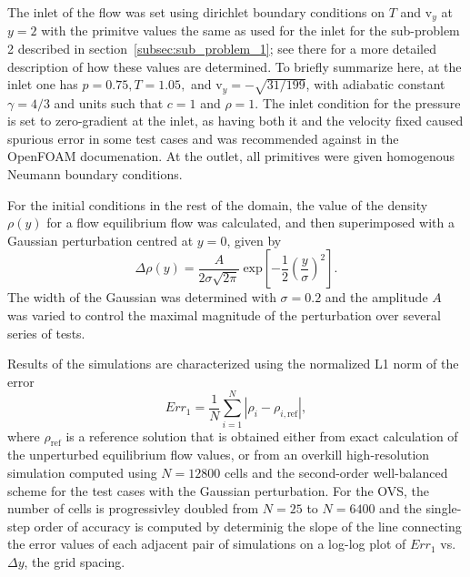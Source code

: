 The inlet of the flow was set using dirichlet boundary conditions on $T$ and $\textrm{v}_y$ at $y=2$ with the primitve values the same as used for the inlet for the sub-problem 2 described in section~\ref{subsec:sub_problem_1}; see there for a more detailed description of how these values are determined. To briefly summarize here, at the inlet one has $p=0.75, T=1.05,$ and $\textrm{v}_y=-\sqrt{31/199}$, with adiabatic constant $\gamma=4/3$ and units such that $c=1$ and $\rho=1$. The inlet condition for the pressure is set to zero-gradient at the inlet, as having both it and the velocity fixed caused spurious error in some test cases and was recommended against in the OpenFOAM documenation. At the outlet, all primitives were given homogenous Neumann boundary conditions.

For the initial conditions in the rest of the domain, the value of the density $\rho(y)$ for a flow equilibrium flow was calculated, and then superimposed with a Gaussian perturbation centred at $y=0$, given by
\begin{equation}
\Delta \rho(y)=\frac{A}{2\sigma \sqrt{2 \pi}}\ \textrm{exp}\left[-\frac{1}{2}\left(\frac{y}{\sigma}\right)^2\right].
\end{equation}
The width of the Gaussian was determined with $\sigma=0.2$ and the amplitude $A$ was varied to control the maximal magnitude of the perturbation over several series of tests.

Results of the simulations are characterized using the normalized L1 norm of the error
\begin{equation}
Err_1=\frac{1}{N}\sum\limits_{i=1}^N \left|\rho_i-\rho_{i,\textrm{ref}}\right|,
\end{equation}
where $\rho_{\textrm{ref}}$ is a reference solution that is obtained either from exact calculation of the unperturbed equilibrium flow values, or from an overkill high-resolution simulation computed using $N=12800$ cells and the second-order well-balanced scheme for the test cases with the Gaussian perturbation. For the OVS, the number of cells is progressivley doubled from $N=25$ to $N=6400$ and the single-step order of accuracy is computed by determinig the slope of the line connecting the error values of each adjacent pair of simulations on a log-log plot of $Err_1$ vs.\ $\Delta y$, the grid spacing.

